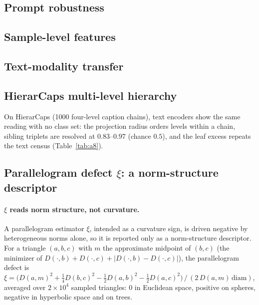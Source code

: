\subsection{Prompt robustness}
\label{app:templates}


\FloatBarrier
\subsection{Sample-level features}
\label{app:sample}

\FloatBarrier
\subsection{Text-modality transfer}

\FloatBarrier
\subsection{HierarCaps multi-level hierarchy}
\label{app:hierarcaps}
On HierarCaps \citep{alper2024hierarcaps} (1000 four-level caption chains), text encoders show the same reading with no class set: the projection radius orders levels within a chain, sibling triplets are resolved at $0.83$--$0.97$ (chance $0.5$), and the leaf excess repeats the text census (Table~\ref{tab:a8}). %

\FloatBarrier
\subsection{Parallelogram defect $\xi$: a norm-structure descriptor}
\label{app:xi}
\paragraph{$\xi$ reads norm structure, not curvature.} A parallelogram estimator $\xi$, intended as a curvature sign, is driven negative by heterogeneous norms alone, so it is reported only as a norm-structure descriptor. %
For a triangle $(a,b,c)$ with $m$ the approximate midpoint of $(b,c)$ (the minimizer of $D(\cdot,b){+}D(\cdot,c){+}|D(\cdot,b){-}D(\cdot,c)|$), the parallelogram defect is $\xi = \big(D(a,m)^2 + \tfrac14 D(b,c)^2 - \tfrac12 D(a,b)^2 - \tfrac12 D(a,c)^2\big)\,/\,(2\,D(a,m)\,\mathrm{diam})$, averaged over $2{\times}10^4$ sampled triangles: $0$ in Euclidean space, positive on spheres, negative in hyperbolic space and on trees.



\FloatBarrier
